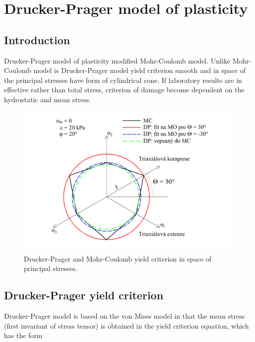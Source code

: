 \mbox{}
\thispagestyle{empty}
\newpage
\section{Drucker-Prager model of plasticity}

\subsection{Introduction}\label{sec:drucker-prager_introduction}
\indent

Drucker-Prager model of plasticity modified Mohr-Coulomb model. Unlike Mohr-Coulomb model is Drucker-Prager model yield criterion smooth and in space of the principal stresses have form of cylindrical cone. If laboratory results are in effective rather than total stress, criterion of damage become dependent on the hydrostatic and mean stress.  

\begin{figure}[h!]
	\centering	
	\includegraphics[width=1.1\textwidth, angle=0]{obrazky/drucker-prager.png}
	\caption[Drucker-Prager a Mohr-Coulomb model $T$]{Drucker-Prager and Mohr-Coulomb yield criterion in space of principal stresses. \label{obr:F1}}
\end{figure}

\subsection{Drucker-Prager yield criterion}\label{sec:drucker-prager_yield_criterion}
\indent

Drucker-Prager model is based on the von Mises model in that the mean stress (first invariant of stress tensor) is obtained in the yield criterion equation, which has the form  

